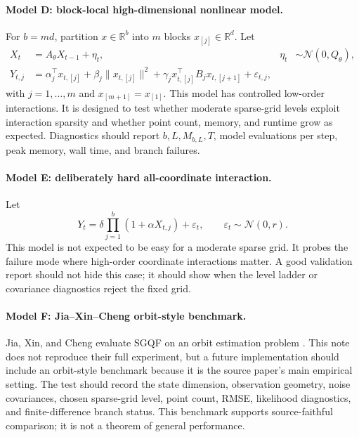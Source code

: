 \documentclass[11pt]{article}
\numberwithin{equation}{section}
\newcommand{\R}{\mathbb R}
\newcommand{\N}{\mathcal N}
\begin{document}
\paragraph{Model D: block-local high-dimensional nonlinear model.}
For \(b=md\), partition \(x\in\R^b\) into \(m\) blocks \(x_{[j]}\in\R^d\).
Let
\begin{align}
  X_t&=A_\theta X_{t-1}+\eta_t,
  &
  \eta_t&\sim\N(0,Q_\theta),
  \label{eq:p32-test-block-state}\\
  Y_{t,j}
  &=
  \alpha_j^\top x_{t,[j]}
  +\beta_j\|x_{t,[j]}\|^2
  +\gamma_j x_{t,[j]}^\top B_jx_{t,[j+1]}
  +\varepsilon_{t,j},
  \label{eq:p32-test-block-obs}
\end{align}
with \(j=1,\ldots,m\) and \(x_{[m+1]}=x_{[1]}\).  This model has controlled
low-order interactions.  It is designed to test whether moderate sparse-grid
levels exploit interaction sparsity and whether point count, memory, and
runtime grow as expected.  Diagnostics should report \(b,L,M_{b,L},T\), model
evaluations per step, peak memory, wall time, and branch failures.

\paragraph{Model E: deliberately hard all-coordinate interaction.}
Let
\begin{equation}
  Y_t
  =
  \delta\prod_{j=1}^b(1+\alpha X_{t,j})
  +\varepsilon_t,
  \qquad \varepsilon_t\sim\N(0,r).
  \label{eq:p32-test-hard}
\end{equation}
This model is not expected to be easy for a moderate sparse grid.  It probes
the failure mode where high-order coordinate interactions matter.  A good
validation report should not hide this case; it should show when the level
ladder or covariance diagnostics reject the fixed grid.

\paragraph{Model F: Jia--Xin--Cheng orbit-style benchmark.}
Jia, Xin, and Cheng evaluate SGQF on an orbit estimation problem
\cite[Section 4]{jia2012sparsegrid}.  This note does not reproduce their full
experiment, but a future implementation should include an orbit-style
benchmark because it is the source paper's main empirical setting.  The test
should record the state dimension, observation geometry, noise covariances,
chosen sparse-grid level, point count, RMSE, likelihood diagnostics, and
finite-difference branch status.  This benchmark supports source-faithful
comparison; it is not a theorem of general performance.
\end{document}
